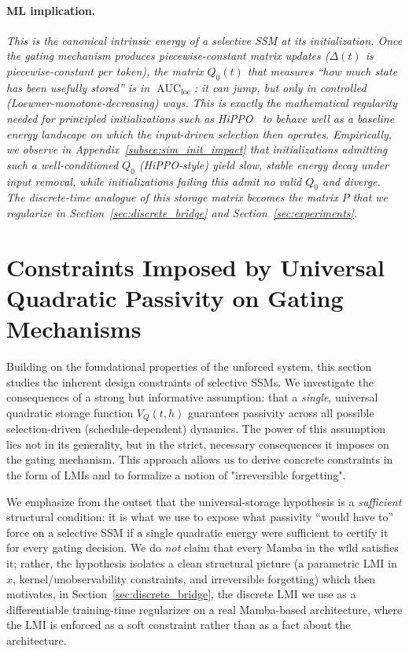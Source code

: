 \documentclass[10pt]{article} %
\newcommand{\loc}{\mathrm{loc}}                         %
\DeclareMathOperator{\AUC}{AUC}                         %
\theoremstyle{definition}
\begin{document}
\paragraph{ML implication.} \textit{This is the canonical intrinsic energy of a selective SSM at its initialization. Once the gating mechanism produces piecewise-constant matrix updates ($\Delta(t)$ is piecewise-constant per token), the matrix $Q_0(t)$ that measures ``how much state has been usefully stored'' is in $\AUC_{\loc}$: it can jump, but only in controlled (Loewner-monotone-decreasing) ways. This is exactly the mathematical regularity needed for principled initializations such as HiPPO~\citep{gu2020hippo} to behave well as a baseline energy landscape on which the input-driven selection then operates. Empirically, we observe in Appendix~\ref{subsec:sim_init_impact} that initializations admitting such a well-conditioned $Q_0$ (HiPPO-style) yield slow, stable energy decay under input removal, while initializations failing this admit no valid $Q_0$ and diverge. The discrete-time analogue of this storage matrix becomes the matrix $P$ that we regularize in Section~\ref{sec:discrete_bridge} and Section~\ref{sec:experiments}.}

\section{Constraints Imposed by Universal Quadratic Passivity on Gating Mechanisms}
\label{sec:universal_quadratic_constraints}
Building on the foundational properties of the unforced system, this section studies the inherent design constraints of selective SSMs. We investigate the consequences of a strong but informative assumption: that a \emph{single}, universal quadratic storage function $V_Q(t,h)$ guarantees passivity across all possible selection-driven (schedule-dependent) dynamics. The power of this assumption lies not in its generality, but in the strict, necessary consequences it imposes on the gating mechanism. This approach allows us to derive concrete constraints in the form of LMIs and to formalize a notion of "irreversible forgetting".

We emphasize from the outset that the universal-storage hypothesis is a \emph{sufficient} structural condition: it is what we use to expose what passivity ``would have to'' force on a selective SSM if a single quadratic energy were sufficient to certify it for every gating decision. We do \emph{not} claim that every Mamba in the wild satisfies it; rather, the hypothesis isolates a clean structural picture (a parametric LMI in $x$, kernel/unobservability constraints, and irreversible forgetting) which then motivates, in Section~\ref{sec:discrete_bridge}, the discrete LMI we use as a differentiable training-time regularizer on a real Mamba-based architecture, where the LMI is enforced as a soft constraint rather than as a fact about the architecture.
\end{document}
